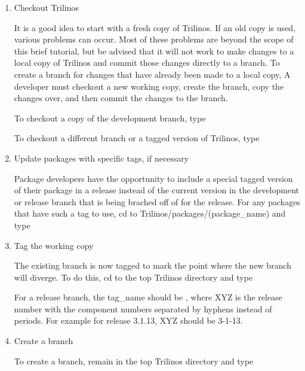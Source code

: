 \documentclass[12pt,relax]{TrilinosDevGuide}
\begin{document}
\begin{enumerate}
\item Checkout Trilinos

It is a good idea to start with a fresh copy of Trilinos.  If an old copy is 
used, various problems can occur.  Most of these problems are beyond the scope 
of this brief tutorial, but be advised that it will not work to make changes 
to a local copy of Trilinos and commit those changes directly to 
a branch.  To create a branch for changes that have already been made to a 
local copy, A developer must checkout a new working copy, create the branch, 
copy the changes over, and then commit the changes to the branch.  

To checkout a copy of the development branch, type


To checkout a different branch or a tagged version of Trilinos, type


\item Update packages with specific tags, if necessary

Package developers have the opportunity to include a special tagged version of 
their package in a release instead of the current version in the 
development or release branch that is being brached off of for the release.  
For any packages that have such a tag to use, cd to 
Trilinos/packages/(package\_name) and type


\item Tag the working copy

The existing branch is now tagged to mark the point where the new branch 
will diverge.  To do this, cd to the top Trilinos 
directory and type


For a release branch, the tag\_name should be 
, where XYZ is the 
release number with the component numbers separated by hyphens instead of 
periods.  For example for release 3.1.13, XYZ should be 3-1-13.

\item Create a branch

To create a branch, remain in the top Trilinos directory and type



\end{enumerate}
\end{document}
